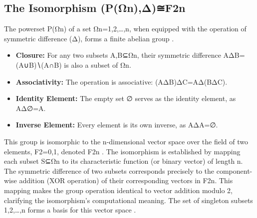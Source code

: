 \documentclass[12pt,a4paper]{article}
\theoremstyle{definition}
\theoremstyle{remark}
\begin{document}
\subsection{The Isomorphism (P(Ωn​),Δ)≅F2n​}
The powerset P(Ωn​) of a set Ωn​={1,2,…,n}, when equipped with the operation of symmetric difference (Δ), forms a finite abelian group \cite{WikipediaPowerset, SymmetricDifferenceGroup}.
\begin{itemize}
\item \textbf{Closure:} For any two subsets A,B⊆Ωn​, their symmetric difference AΔB=(A∪B)∖(A∩B) is also a subset of Ωn​.
\item \textbf{Associativity:} The operation is associative: (AΔB)ΔC=AΔ(BΔC).
\item \textbf{Identity Element:} The empty set ∅ serves as the identity element, as AΔ∅=A.
\item \textbf{Inverse Element:} Every element is its own inverse, as AΔA=∅.
\end{itemize}
This group is isomorphic to the n-dimensional vector space over the field of two elements, F2​={0,1}, denoted F2n​ \cite{F2nVectorSpace, BooleanRing}. The isomorphism is established by mapping each subset S⊆Ωn​ to its characteristic function (or binary vector) of length n. The symmetric difference of two subsets corresponds precisely to the component-wise addition (XOR operation) of their corresponding vectors in F2n​. This mapping makes the group operation identical to vector addition modulo 2, clarifying the isomorphism’s computational meaning. The set of singleton subsets {{1},{2},…,{n}} forms a basis for this vector space \cite{F2nVectorSpace}.
\end{document}
